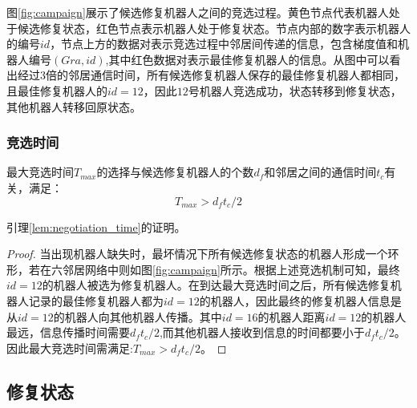 图\ref{fig:campaign}展示了候选修复机器人之间的竞选过程。黄色节点代表机器人处于候选修复状态，红色节点表示机器人处于修复状态。节点内部的数字表示机器人的编号$id$，节点上方的数据对表示竞选过程中邻居间传递的信息，包含梯度值和机器人编号$(Gra,id)$,其中红色数据对表示最佳修复机器人的信息。从图中可以看出经过3倍的邻居通信时间，所有候选修复机器人保存的最佳修复机器人都相同，且最佳修复机器人的$id = 12$，因此$12$号机器人竞选成功，状态转移到修复状态，其他机器人转移回原状态。
\begin{figure*}[!htbp]
	\centering
\end{figure*}

\subsubsection{竞选时间}
\begin{lem}
	\label{lem:negotiation_time}
	最大竞选时间$T_{max}$的选择与候选修复机器人的个数$d_f$和邻居之间的通信时间$t_c$有关，满足：
	\[
		T_{max} > d_f t_c/2
	\]
	
	引理\ref{lem:negotiation_time}的证明。
	
	\begin{proof}
		当出现机器人缺失时，最坏情况下所有候选修复状态的机器人形成一个环形，若在六邻居网络中则如图\ref{fig:campaign}所示。根据上述竞选机制可知，最终$id=12$的机器人被选为修复机器人。在到达最大竞选时间之后，所有候选修复机器人记录的最佳修复机器人都为$id=12$的机器人，因此最终的修复机器人信息是从$id=12$的机器人向其他机器人传播。其中$id=16$的机器人距离$id=12$的机器人最远，信息传播时间需要$d_f t_c/2$,而其他机器人接收到信息的时间都要小于$d_f t_c/2$。因此最大竞选时间需满足:$T_{max} > d_f t_c/2$。
	\end{proof}
\end{lem}

\subsection{修复状态}

